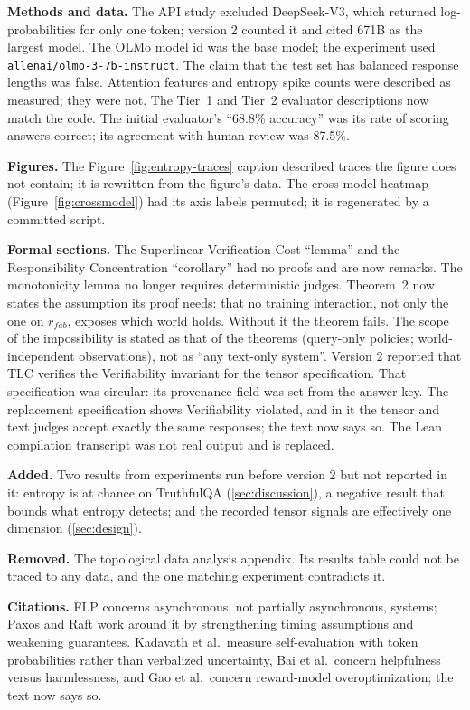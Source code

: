 \documentclass[11pt]{article}
\newcommand{\fakepara}[1]{\noindent\textbf{#1}\xspace}
\begin{document}
\fakepara{Methods and data.} The API study excluded DeepSeek-V3, which returned
log-probabilities for only one token; version 2 counted it and cited 671B as the
largest model. The OLMo model id was the base model; the experiment used
\texttt{allenai/olmo-3-7b-instruct}. The claim that the test set has balanced
response lengths was false. Attention features and entropy spike counts were
described as measured; they were not. The Tier~1 and Tier~2 evaluator
descriptions now match the code. The initial evaluator's ``68.8\% accuracy'' was
its rate of scoring answers correct; its agreement with human review was 87.5\%.

\fakepara{Figures.} The Figure~\ref{fig:entropy-traces} caption described traces
the figure does not contain; it is rewritten from the figure's data. The
cross-model heatmap (Figure~\ref{fig:crossmodel}) had its axis labels permuted;
it is regenerated by a committed script.

\fakepara{Formal sections.} The Superlinear Verification Cost ``lemma'' and the
Responsibility Concentration ``corollary'' had no proofs and are now remarks.
The monotonicity lemma no longer requires deterministic judges. Theorem~2 now
states the assumption its proof needs: that no training interaction, not only
the one on $r_{fab}$, exposes which world holds. Without it the theorem fails.
The scope of the impossibility is stated as that of the theorems (query-only
policies; world-independent observations), not as ``any text-only system''.
Version 2 reported that TLC verifies the Verifiability invariant for the
tensor specification. That specification was circular: its provenance field
was set from the answer key. The replacement specification shows
Verifiability violated, and in it the tensor and text judges accept exactly
the same responses; the text now says so. The Lean compilation transcript was not real output and is
replaced.

\fakepara{Added.} Two results from experiments run before version 2 but not reported in it: entropy is at chance on TruthfulQA (\autoref{sec:discussion}), a negative result that bounds what entropy detects; and the recorded tensor signals are effectively one dimension (\autoref{sec:design}).

\fakepara{Removed.} The topological data analysis appendix. Its results table
could not be traced to any data, and the one matching experiment contradicts it.

\fakepara{Citations.} FLP concerns asynchronous, not partially asynchronous,
systems; Paxos and Raft work around it by strengthening timing assumptions and
weakening guarantees. Kadavath et al.\ measure self-evaluation with token
probabilities rather than verbalized uncertainty, Bai et al.\ concern helpfulness
versus harmlessness, and Gao et al.\ concern reward-model overoptimization; the
text now says so.
\end{document}
